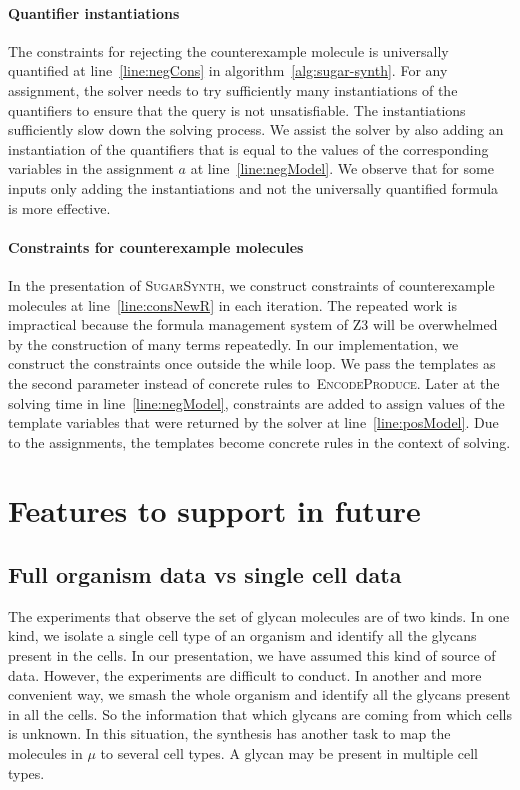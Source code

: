 \documentclass{llncs}
\begin{document}
\paragraph{Quantifier instantiations}
The constraints for rejecting the counterexample molecule is universally quantified at line~\ref{line:negCons} in algorithm~\ref{alg:sugar-synth}.
For any assignment, the solver needs to try sufficiently many instantiations of the quantifiers
to ensure that the query is not unsatisfiable.
The instantiations sufficiently slow down the solving process.
We assist the solver by also adding an instantiation of the quantifiers that is equal
to the values of the corresponding variables in the assignment $a$ at line~\ref{line:negModel}.
We observe that for some inputs only adding the instantiations and not the universally quantified
formula is more effective.

\paragraph{Constraints for counterexample molecules}
In the presentation of \textsc{SugarSynth}, we construct constraints of counterexample molecules
at line~\ref{line:consNewR} in each iteration.
The repeated work is impractical because the formula management system of Z3 will be overwhelmed by
the construction of many terms repeatedly. In our implementation, we construct the constraints
once outside the while loop.
We pass the templates as the second parameter instead of concrete rules to~\textsc{EncodeProduce}.
Later at the solving time in line~\ref{line:negModel}, constraints are added to assign values
of the template variables that were returned by the solver at line~\ref{line:posModel}.
Due to the assignments, the templates become concrete rules in the context of solving.

\section{Features to support in future}

\subsection{Full organism data vs single cell data}

The experiments that observe the set of glycan molecules are of two kinds. In one kind, we isolate a single cell type of an organism and identify all the glycans present in the cells. In our presentation, we have assumed this kind of source of data. However, the experiments are difficult to conduct.
In another and more convenient way, we smash the whole organism and identify all the glycans present in all the cells.
So the information that which glycans are coming from which
cells is unknown.
In this situation, the synthesis has another task to map the molecules
in $\mu$ to several cell types.
A glycan may be present in multiple cell types.
\end{document}

